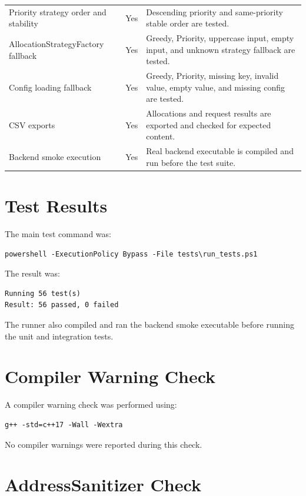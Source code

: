 \documentclass[12pt,a4paper]{article}
\begin{document}
\begin{longtable}{@{} p{5.2cm} p{2.2cm} p{7.0cm} @{}}
Priority strategy order and stability & Yes & Descending priority and same-priority stable order are tested. \\
AllocationStrategyFactory fallback & Yes & Greedy, Priority, uppercase input, empty input, and unknown strategy fallback are tested. \\
Config loading fallback & Yes & Greedy, Priority, missing key, invalid value, empty value, and missing config are tested. \\
CSV exports & Yes & Allocations and request results are exported and checked for expected content. \\
Backend smoke execution & Yes & Real backend executable is compiled and run before the test suite. \\
\bottomrule
\end{longtable}

\section{Test Results}

The main test command was:

\begin{verbatim}
powershell -ExecutionPolicy Bypass -File tests\run_tests.ps1
\end{verbatim}

The result was:

\begin{verbatim}
Running 56 test(s)
Result: 56 passed, 0 failed
\end{verbatim}

The runner also compiled and ran the backend smoke executable before running the unit and integration tests.

\section{Compiler Warning Check}

A compiler warning check was performed using:

\begin{verbatim}
g++ -std=c++17 -Wall -Wextra
\end{verbatim}

No compiler warnings were reported during this check.

\section{AddressSanitizer Check}
\end{document}
